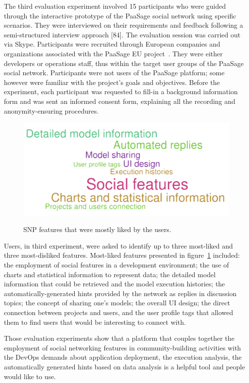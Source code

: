 The third evaluation experiment involved 15 participants who were guided through the interactive prototype of the PaaSage social network using specific scenarios. They were interviewed on their requirements and feedback following a semi-structured interview approach [84]. The evaluation session was carried out via Skype. Participants were recruited through European companies and organizations associated with the PaaSage EU project~\cite{paasage}. They were either developers or operations staff, thus within the target user groups of the PaaSage social network. Participants were not users of the PaaSage platform; some however were familiar with the project’s goals and objectives. Before the experiment, each participant was requested to fill-in a background information form and was sent an informed consent form, explaining all the recording and anonymity-ensuring procedures. 

\begin{figure}[h]
	\caption{SNP features that were mostly liked by the users.}
	\includegraphics[width=1\textwidth,natwidth=200,natheight=150]{./fig/most-liked.pdf}
	\centering
	\label{fig:most-liked}
\end{figure}

Users, in third experiment, were asked to identify up to three most-liked and three most-disliked features. Most-liked features presented in figure~\ref{fig:most-liked} included: the employment of social features in a development environment; the use of charts and statistical information to represent data; the detailed model information that could be retrieved and the model execution histories; the automatically-generated hints provided by the network as replies in discussion topics; the concept of sharing one’s models; the overall UI design; the direct connection between projects and users, and the user profile tags that allowed them to find users that would be interesting to connect with.

Those evaluation experiments show that a platform that couples together the employment of social networking features in community-building activities with the DevOps demands about application deployment, the execution analysis, the automatically generated hints based on data analysis is a helpful tool and people would like to use.